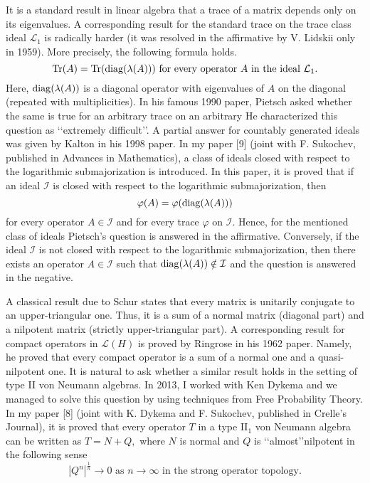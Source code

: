 \documentclass[12pt]{article}
\begin{document}
It is a standard result in linear algebra that a trace of a matrix depends only on its eigenvalues. A corresponding result for the standard trace on the trace class ideal $\mathcal{L}_1$ is radically harder (it was resolved in the affirmative by V. Lidskii only in 1959). More precisely, the following formula holds.
$${\rm Tr}(A)={\rm Tr}({\rm diag}(\lambda(A)))\mbox{ for every operator }A\mbox{ in the ideal }\mathcal{L}_1.$$
Here, ${\rm diag}(\lambda(A))$ is a diagonal operator with eigenvalues of $A$ on the diagonal (repeated with multiplicities). In his famous 1990 paper, Pietsch asked  whether the same is true for an arbitrary trace on an arbitrary%
He characterized this question as \lq\lq extremely difficult\rq\rq. A partial answer for countably generated ideals was given by Kalton in his 1998 paper. In my paper [9] (joint with F. Sukochev, published in Advances in Mathematics), a class of ideals closed with respect to the logarithmic submajorization is introduced. In this paper, it is proved that if an ideal $\mathcal{I}$ is closed with respect to the logarithmic submajorization, then
$$\varphi(A)=\varphi({\rm diag}(\lambda(A)))$$
for every operator $A\in\mathcal{I}$ and for every trace $\varphi$ on $\mathcal{I}.$ Hence, for the mentioned class of ideals Pietsch's question is answered in the affirmative. Conversely, if the ideal $\mathcal{I}$ is not closed with respect to the logarithmic submajorization, then there exists an operator $A\in\mathcal{I}$ such that ${\rm diag}(\lambda(A))\notin\mathcal{I}$ and the question is answered in the negative.

A classical result due to Schur states that every matrix is unitarily conjugate to an upper-triangular one. Thus, it is a sum of a normal matrix (diagonal part) and a nilpotent matrix (strictly upper-triangular part). A corresponding result for compact operators in $\mathcal{L}(H)$ is proved by Ringrose in his 1962 paper. Namely, he proved that every compact operator is a sum of a normal one and a quasi-nilpotent one. It is natural to ask whether a similar result holds in the setting of type II von Neumann algebras. In 2013, I worked with Ken Dykema and we managed to solve this question by using techniques from Free Probability Theory. In my paper [8] (joint with K. Dykema and F. Sukochev, published in Crelle's Journal), it is proved that every operator $T$ in a type II$_1$ von Neumann algebra can be written as $T=N+Q,$ where $N$ is normal and $Q$ is \lq\lq almost\rq\rq nilpotent in the following sense
$$|Q^n|^{\frac1n}\to0\mbox{ as }n\to\infty\mbox{ in the strong operator topology.}$$
\end{document}
